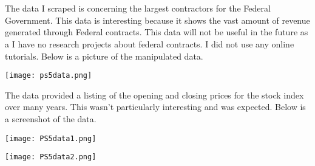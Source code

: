 \author{jmalpert }
\date{March 2022}



\maketitle

\section{}


The data I scraped is concerning the largest contractors for the Federal Government.  This data is interesting because it shows the vast amount of revenue generated through Federal contracts.  This data will not be useful in the future as a I have no research projects about federal contracts.  I did not use any online tutorials.  Below is a picture of the manipulated data.

\vspace{3mm}

\texttt{[image: ps5data.png]}

\vspace{3mm}

The data provided a listing of the opening and closing prices for the stock index over many years.  This wasn't particularly interesting and was expected.  Below is a screenshot of the data.  
\vspace{3mm}

\texttt{[image: PS5data1.png]}

\vspace{3mm}

\texttt{[image: PS5data2.png]}

